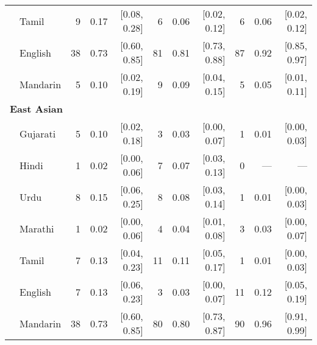 \begin{table}[t]
\begin{footnotesize}
\begin{tabular}{p{.1in}lrrrrrrrrr}
 & Tamil & 9 & 0.17 & [0.08, 0.28] & 6 & 0.06 & [0.02, 0.12] & 6 & 0.06 & [0.02, 0.12]\\

 & English & 38 & 0.73 & [0.60, 0.85] & 81 & 0.81 & [0.73, 0.88] & 87 & 0.92 & [0.85, 0.97]\\

 & Mandarin & 5 & 0.10 & [0.02, 0.19] & 9 & 0.09 & [0.04, 0.15] & 5 & 0.05 & [0.01, 0.11]\\

\midrule
\multicolumn{11}{l}{\textbf{East Asian}}\\
& Gujarati & 5 & 0.10 & [0.02, 0.18] & 3 & 0.03 & [0.00, 0.07] & 1 & 0.01 & [0.00, 0.03]\\

 & Hindi & 1 & 0.02 & [0.00, 0.06] & 7 & 0.07 & [0.03, 0.13] & 0 & --- & ---\\

 & Urdu & 8 & 0.15 & [0.06, 0.25] & 8 & 0.08 & [0.03, 0.14] & 1 & 0.01 & [0.00, 0.03]\\

 & Marathi & 1 & 0.02 & [0.00, 0.06] & 4 & 0.04 & [0.01, 0.08] & 3 & 0.03 & [0.00, 0.07]\\

 & Tamil & 7 & 0.13 & [0.04, 0.23] & 11 & 0.11 & [0.05, 0.17] & 1 & 0.01 & [0.00, 0.03]\\

 & English & 7 & 0.13 & [0.06, 0.23] & 3 & 0.03 & [0.00, 0.07] & 11 & 0.12 & [0.05, 0.19]\\

& Mandarin & 38 & 0.73 & [0.60, 0.85] & 80 & 0.80 & [0.73, 0.87] & 90 & 0.96 & [0.91, 0.99]\\

\bottomrule
\end{tabular}
\end{footnotesize}
\end{table}